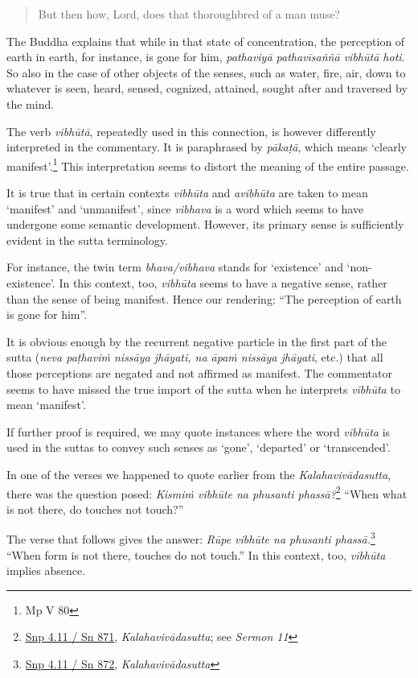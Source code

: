 \begin{quote}
But then how, Lord, does that thoroughbred of a man muse?
\end{quote}

The Buddha explains that while in that state of concentration, the perception of earth in earth, for instance, is gone for him, \emph{pathaviyā pathavīsaññā vibhūtā hoti}. So also in the case of other objects of the senses, such as water, fire, air, down to whatever is seen, heard, sensed, cognized, attained, sought after and traversed by the mind.

The verb \emph{vibhūtā}, repeatedly used in this connection, is however differently interpreted in the commentary. It is paraphrased by \emph{pākaṭā}, which means `clearly manifest'.\footnote{Mp V 80} This interpretation seems to distort the meaning of the entire passage.

It is true that in certain contexts \emph{vibhūta} and \emph{avibhūta} are taken to mean `manifest' and `unmanifest', since \emph{vibhava} is a word which seems to have undergone some semantic development. However, its primary sense is sufficiently evident in the sutta terminology.

For instance, the twin term \emph{bhava/vibhava} stands for `existence' and `non-existence'. In this context, too, \emph{vibhūta} seems to have a negative sense, rather than the sense of being manifest. Hence our rendering: ``The perception of earth is gone for him''.

It is obvious enough by the recurrent negative particle in the first part of the sutta (\emph{neva paṭhaviṁ nissāya jhāyati, na āpaṁ nissāya jhāyati}, etc.) that all those perceptions are negated and not affirmed as manifest. The commentator seems to have missed the true import of the sutta when he interprets \emph{vibhūta} to mean `manifest'.

If further proof is required, we may quote instances where the word \emph{vibhūta} is used in the suttas to convey such senses as `gone', `departed' or `transcended'.

In one of the verses we happened to quote earlier from the \emph{Kalahavivādasutta}, there was the question posed: \emph{Kismiṁ vibhūte na phusanti phassā?}\footnote{\href{https://suttacentral.net/snp4.11/pli/ms}{Snp 4.11 / Sn 871}, \emph{Kalahavivādasutta}; see \emph{Sermon 11}} ``When what is not there, do touches not touch?''

The verse that follows gives the answer: \emph{Rūpe vibhūte na phusanti phassā.}\footnote{\href{https://suttacentral.net/snp4.11/pli/ms}{Snp 4.11 / Sn 872}, \emph{Kalahavivādasutta}} ``When form is not there, touches do not touch.'' In this context, too, \emph{vibhūta} implies absence.

